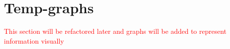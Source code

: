 \section{Temp-graphs}

\textcolor{red}{This section will be refactored later and graphs will be added to represent information visually}

